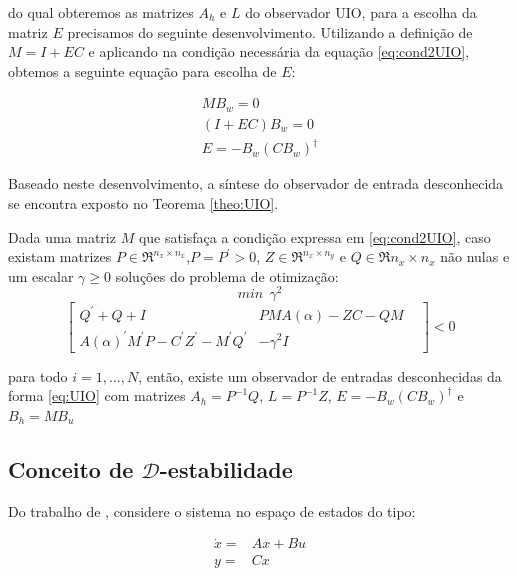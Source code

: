 do qual obteremos as matrizes $A_h$ e $L$ do observador UIO, para a escolha da matriz $E$ precisamos do seguinte desenvolvimento. Utilizando a definição de $M=I+EC$ e aplicando na condição necessária da equação \ref{eq:cond2UIO}, obtemos a seguinte equação para escolha de $E$:

\begin{equation}
    \begin{split}
        MB_w=0\\
        (I+EC)B_w=0\\
        E=-B_w(CB_w)^{\dagger}
    \end{split}
\end{equation}

Baseado neste desenvolvimento, a síntese do observador de entrada desconhecida se encontra exposto no Teorema \ref{theo:UIO}.
\break
\begin{teorema} \label{theo:UIO}
 Dada uma matriz $M$ que satisfaça a condição expressa em \ref{eq:cond2UIO}, caso existam matrizes $P \in \Re^{n_{x} \times n_{x}}$,$P=P^'>0$, $Z \in \Re^{n_{x} \times n_{y}}$ e $Q \in \Re{n_{x} \times n_{x}}$ não nulas e um escalar $\gamma\geq0$ soluções do problema de otimização:
 \begin{equation*}
         min \ \ \gamma^2 
 \end{equation*}
  \begin{equation}
         \begin{bmatrix}
            Q^'+Q+I& PMA(\alpha)-ZC-QM&\\ 
            A(\alpha)^'M^'P-C^'Z^'-M^'Q^'& -\gamma^2I
    \end{bmatrix} <0
 \end{equation}
\end{teorema}

para todo $i=1,\dots,N$, então, existe um observador de entradas desconhecidas da forma \ref{eq:UIO} com matrizes $A_h=P^{-1}Q$, $L=P^{-1}Z$, $E=-B_w(CB_w)^{\dagger}$ e $B_h=MB_u$
\subsection{Conceito de \( \mathcal{D}\)-estabilidade}

Do trabalho de \cite{Chiali1996HApprocah}, considere o sistema no espaço de estados do tipo:

\begin{equation} \label{eq:dsta:linsys}
    \begin{split}
    \dot{x}=&Ax+Bu\\
          y=&Cx    
    \end{split}
\end{equation}

